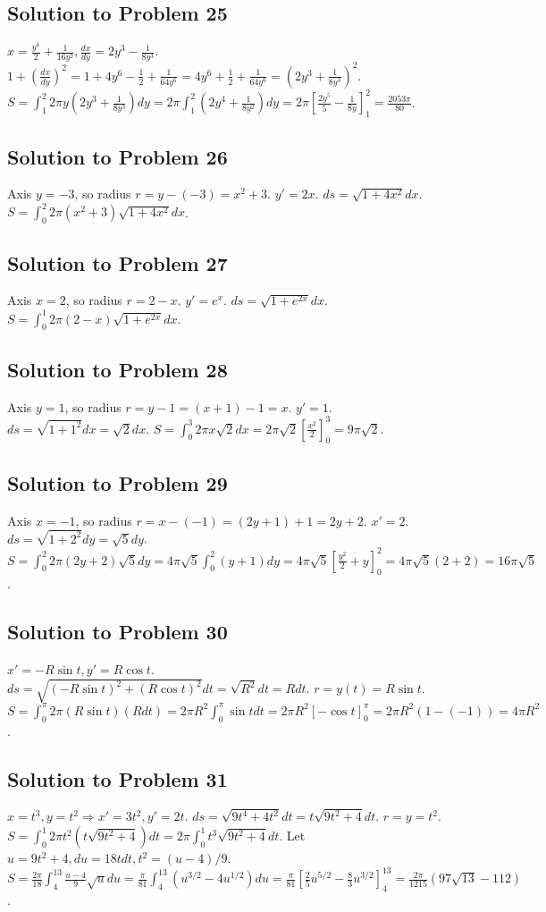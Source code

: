 \documentclass[12pt]{article}
\begin{document}
\subsection*{Solution to Problem 25}
$x=\frac{y^4}{2}+\frac{1}{16y^2}, \frac{dx}{dy}=2y^3-\frac{1}{8y^3}$. $1+(\frac{dx}{dy})^2=1+4y^6-\frac{1}{2}+\frac{1}{64y^6}=4y^6+\frac{1}{2}+\frac{1}{64y^6}=(2y^3+\frac{1}{8y^3})^2$.
$S=\int_1^2 2\pi y(2y^3+\frac{1}{8y^3})dy=2\pi\int_1^2(2y^4+\frac{1}{8y^2})dy=2\pi[\frac{2y^5}{5}-\frac{1}{8y}]_1^2 = \frac{2053\pi}{80}$.

\subsection*{Solution to Problem 26}
Axis $y=-3$, so radius $r=y-(-3)=x^2+3$. $y'=2x$. $ds=\sqrt{1+4x^2}dx$.
$S=\int_0^2 2\pi(x^2+3)\sqrt{1+4x^2}dx$.

\subsection*{Solution to Problem 27}
Axis $x=2$, so radius $r=2-x$. $y'=e^x$. $ds=\sqrt{1+e^{2x}}dx$.
$S=\int_0^1 2\pi(2-x)\sqrt{1+e^{2x}}dx$.

\subsection*{Solution to Problem 28}
Axis $y=1$, so radius $r=y-1=(x+1)-1=x$. $y'=1$. $ds=\sqrt{1+1^2}dx=\sqrt{2}dx$.
$S=\int_0^3 2\pi x \sqrt{2} dx = 2\pi\sqrt{2}[\frac{x^2}{2}]_0^3 = 9\pi\sqrt{2}$.

\subsection*{Solution to Problem 29}
Axis $x=-1$, so radius $r=x-(-1)=(2y+1)+1=2y+2$. $x'=2$. $ds=\sqrt{1+2^2}dy=\sqrt{5}dy$.
$S=\int_0^2 2\pi(2y+2)\sqrt{5}dy = 4\pi\sqrt{5}\int_0^2(y+1)dy = 4\pi\sqrt{5}[\frac{y^2}{2}+y]_0^2 = 4\pi\sqrt{5}(2+2)=16\pi\sqrt{5}$.

\subsection*{Solution to Problem 30}
$x'= -R\sin t, y'=R\cos t$. $ds=\sqrt{(-R\sin t)^2+(R\cos t)^2}dt = \sqrt{R^2}dt=Rdt$. $r=y(t)=R\sin t$.
$S=\int_0^\pi 2\pi (R\sin t) (R dt) = 2\pi R^2 \int_0^\pi \sin t dt = 2\pi R^2[-\cos t]_0^\pi = 2\pi R^2(1-(-1))=4\pi R^2$.

\subsection*{Solution to Problem 31}
$x=t^3, y=t^2 \Rightarrow x'=3t^2, y'=2t$. $ds=\sqrt{9t^4+4t^2}dt = t\sqrt{9t^2+4}dt$. $r=y=t^2$.
$S=\int_0^1 2\pi t^2 (t\sqrt{9t^2+4})dt = 2\pi\int_0^1 t^3\sqrt{9t^2+4}dt$.
Let $u=9t^2+4, du=18tdt, t^2=(u-4)/9$. $S=\frac{2\pi}{18}\int_4^{13}\frac{u-4}{9} \sqrt{u} du = \frac{\pi}{81}\int_4^{13}(u^{3/2}-4u^{1/2})du = \frac{\pi}{81}[\frac{2}{5}u^{5/2}-\frac{8}{3}u^{3/2}]_4^{13} = \frac{2\pi}{1215}(97\sqrt{13}-112)$.
\end{document}
